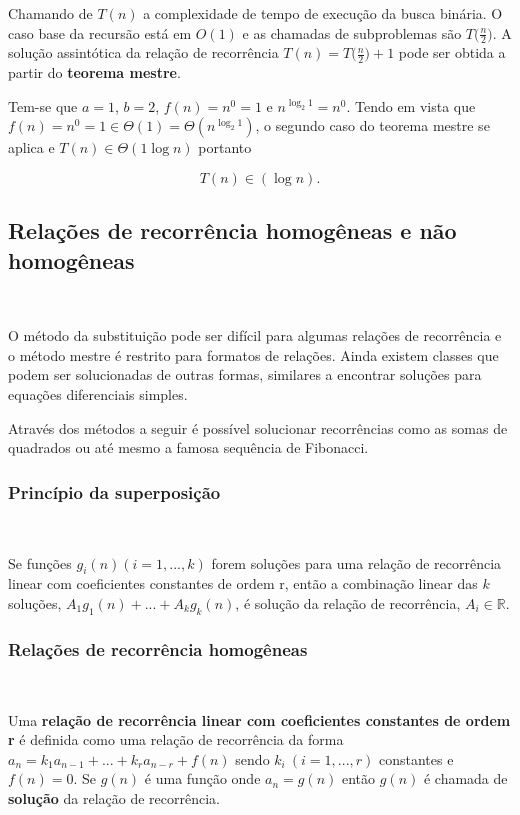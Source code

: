 Chamando de $T(n)$ a complexidade de tempo de execução da busca binária. O caso base da recursão está em $O(1)$ e as chamadas de subproblemas são $T\Bigr(\frac{n}{2}\Bigr)$. A solução assintótica da relação de recorrência $T(n)=T\Bigr(\frac{n}{2}\Bigr)+1$ pode ser obtida a partir do \textbf{teorema mestre}.

Tem-se que $a=1$, $b=2$, $f(n)=n^0=1$ e $n^{\log_2 1}=n^0$. Tendo em vista que $f(n)=n^0=1 \in \Theta(1)=\Theta(n^{\log_2 1})$, o segundo caso do teorema mestre se aplica e $T(n) \in \Theta(1 \log n)$ portanto

\[T(n) \in (\log n).\]



\subsection{Relações de recorrência homogêneas e não homogêneas}
\

O método da substituição pode ser difícil para algumas relações de recorrência e o método mestre é restrito para formatos de relações. Ainda existem classes que podem ser solucionadas de outras formas, similares a encontrar soluções para equações diferenciais simples.

Através dos métodos a seguir é possível solucionar recorrências como as somas de quadrados ou até mesmo a famosa sequência de Fibonacci.

\subsubsection{Princípio da superposição}
\

Se funções $g_i(n) (i = 1, ..., k)$ forem soluções para uma relação de recorrência linear com coeficientes constantes de ordem r, então a combinação linear das $k$ soluções, $A_1g_1(n) + ... + A_kg_k(n)$, é solução da relação de recorrência, $A_i \in \mathbb{R}$.

\subsubsection{Relações de recorrência homogêneas}
\

Uma \textbf{relação de recorrência linear com coeficientes constantes de ordem r} é definida como uma relação de recorrência da forma $a_n = k_1a_{n-1}+...+k_ra_{n-r} + f(n)$ sendo $k_i \ (i = 1, ... , r)$ constantes e $f(n) = 0$. Se $g(n)$ é uma função onde $a_n=g(n)$ então $g(n)$ é chamada de \textbf{solução} da relação de recorrência.

